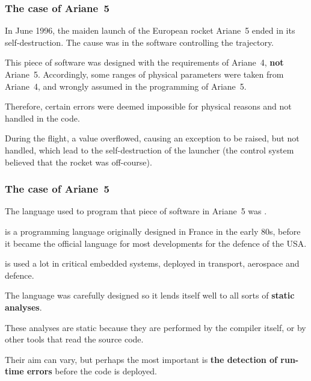 \documentclass[compress,dvipdfmx]{beamer}
\begin{document}
\begin{frame}
  \frametitle{The case of Ariane~5}

  In June 1996, the maiden launch of the European rocket Ariane~5
  ended in its self\hyp{}destruction. The cause was in the software
  controlling the trajectory.

  \bigskip

  This piece of software was designed with the requirements of
  Ariane~4, \textbf{not} Ariane~5. Accordingly, some ranges of
  physical parameters were taken from Ariane~4, and wrongly assumed in
  the programming of Ariane~5.

  \bigskip

  Therefore, certain errors were deemed impossible for physical
  reasons and not handled in the code.

  \bigskip

  During the flight, a value overflowed, causing an exception to be
  raised, but not handled, which lead to the self\hyp{}destruction of
  the launcher (the control system believed that the rocket was
  off\hyp{}course).

\end{frame}


\begin{frame}
  \frametitle{The case of Ariane~5}

  The language used to program that piece of software in Ariane~5 was
  \Ada.

  \bigskip

  \Ada is a programming language originally designed in France in the
  early 80s, before it became the official language for most
  developments for the defence of the USA.

  \bigskip

  \Ada is used a lot in critical embedded systems, deployed in
  transport, aerospace and defence.

  \bigskip

  The language was carefully designed so it lends itself well to all
  sorts of \textbf{static analyses}.

  \bigskip

  These analyses are static because they are performed by the \Ada
  compiler itself, or by other tools that read the source code.

  \bigskip

  Their aim can vary, but perhaps the most important is \textbf{the
    detection of run\hyp{}time errors} before the code is deployed.

\end{frame}
\end{document}
